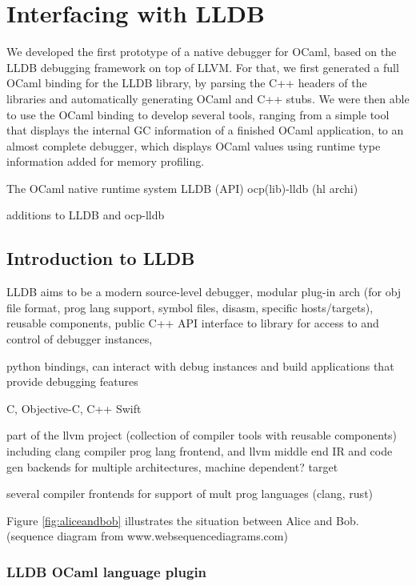 \chapter{Interfacing with LLDB\label{cha:chapter4}}


We developed the first prototype of a native debugger for OCaml, based on the LLDB debugging framework on top of LLVM. For that, we first generated a full OCaml binding for the LLDB library, by parsing the C++ headers of the libraries and automatically generating OCaml and C++ stubs. We were then able to use the OCaml binding to develop several tools, ranging from a simple tool that displays the internal GC information of a finished OCaml application, to an almost complete debugger, which displays OCaml values using runtime type information added for memory profiling.

The OCaml native runtime system
LLDB (API)
ocp(lib)-lldb (hl archi)

additions to LLDB and ocp-lldb

\section{Introduction to LLDB}

LLDB\autocite{}
aims to be a modern source-level debugger, modular plug-in arch (for obj file
format, prog lang support, symbol files, disasm, specific hosts/targets), reusable components, public
C++ API interface to library for access to and control of debugger instances,

python bindings,
can interact with debug instances and build applications that provide debugging features

 C, Objective-C, C++ Swift

part of the llvm project (collection of compiler tools with reusable components)
including clang compiler prog lang frontend, and llvm middle end IR and code gen backends
for multiple architectures, machine dependent? target

several compiler frontends for support of mult prog languages (clang, rust)


Figure \ref{fig:aliceandbob} illustrates the situation between Alice and Bob. (sequence diagram from www.websequencediagrams.com)


\subsection{LLDB OCaml language plugin}

